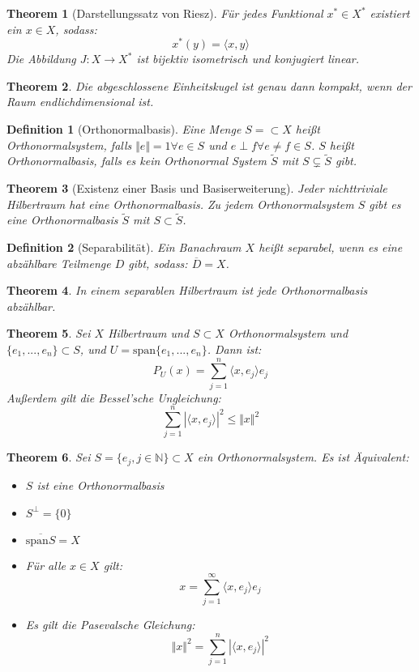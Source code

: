 \documentclass[10pt,a4paper]{article}
\newtheorem{theorem}{Theorem}
\newtheorem{definition}{Definition}
\begin{document}
\begin{theorem}[Darstellungssatz von Riesz]
	Für jedes Funktional $x^*\in X^*$ existiert ein $x\in X$, sodass:
	$$x^*(y) = \langle x, y\rangle$$ 
	Die Abbildung $J: X \to X^*$ ist bijektiv isometrisch und konjugiert linear.
\end{theorem}
\begin{theorem}
	Die abgeschlossene Einheitskugel ist genau dann kompakt, wenn der Raum endlichdimensional ist.
\end{theorem}
\begin{definition}[Orthonormalbasis]
	Eine Menge $S = \subset X$ heißt Orthonormalsystem, falls $\Vert e\Vert = 1 \forall e \in S$ und $e\perp f\forall e\neq f \in S$. $S$ heißt Orthonormalbasis, falls es kein Orthonormal System $\tilde{S}$ mit $S\subsetneq \tilde{S}$ gibt.
\end{definition}
\begin{theorem}[Existenz einer Basis und Basiserweiterung]
	Jeder nichttriviale Hilbertraum hat eine Orthonormalbasis. Zu jedem Orthonormalsystem $S$ gibt es eine Orthonormalbasis $\tilde{S}$ mit $S \subset \tilde{S}$.
\end{theorem}
\begin{definition}[Separabilität]
	Ein Banachraum $X$ heißt separabel, wenn es eine abzählbare Teilmenge $D$ gibt, sodass: $\overline{D} = X$.
\end{definition}
\begin{theorem}
	In einem separablen Hilbertraum ist jede Orthonormalbasis abzählbar.
\end{theorem}
\begin{theorem}
	Sei $X$ Hilbertraum und $S\subset X$ Orthonormalsystem und $\{e_1, ..., e_n\}\subset S$, und $U = \text{span}\{e_1, ..., e_n\}$. Dann ist:
	$$P_U(x)= \sum_{j=1}^n\langle x, e_j\rangle e_j$$
	Außerdem gilt die Bessel'sche Ungleichung:
	$$\sum_{j=1}^{n}|\langle x, e_j\rangle|^2 \leq \Vert x\Vert^2$$
\end{theorem}
\begin{theorem}
	Sei $S= \{e_j, j \in\mathbb{N} \}\subset X$ ein Orthonormalsystem. Es ist Äquivalent:
	\begin{itemize}
		\item $S$ ist eine Orthonormalbasis
		\item $S^\perp =\{0\}$
		\item $\overline{\text{span}S} = X$
		\item Für alle $x \in X$ gilt:
		$$x =\sum_{j=1}^{\infty}\langle x, e_j \rangle e_j$$
		\item Es gilt die Pasevalsche Gleichung:
		$$\Vert x\Vert^2 = \sum_{j=1}^{n}|\langle x, e_j\rangle|^2 $$
	\end{itemize}
\end{theorem}
\end{document}
